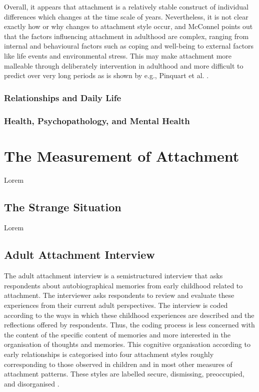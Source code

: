 \documentclass[12pt]{report}
\begin{document}
Overall, it appears that attachment is a relatively stable construct of individual differences which changes at the time scale of years. Nevertheless, it is not clear exactly how or why changes to attachment style occur, and McConnel \cite{McConnell2011} points out that the factors influencing attachment in adulthood are complex, ranging from internal and behavioural factors such as coping and well-being to external factors like life events and environmental stress. This may make attachment more malleable through deliberately intervention in adulthood and more difficult to predict over very long periods as is shown by e.g., Pinquart et al. \cite{Pinquart2013}.

\subsubsection{Relationships and Daily Life}

\subsubsection{Health, Psychopathology, and Mental Health}

\section{The Measurement of Attachment}
Lorem

\subsection{The Strange Situation}
Lorem

\subsection{Adult Attachment Interview}
The adult attachment interview is a semistructured interview that asks respondents about autobiographical memories from early childhood related to attachment. The interviewer asks respondents to review and evaluate these experiences from their current adult perspectives. The interview is coded according to the ways in which these childhood experiences are described and the reflections offered by respondents. Thus, the coding process is less concerned with the content of the specific content of memories and more interested in the organisation of thoughts and memories. This cognitive organisation according to early relationships is categorised into four attachment styles roughly corresponding to those observed in children and in most other measures of attachment patterns. These styles are labelled secure, dismissing, preoccupied, and disorganised \cite{Hesse1999, AAITest}.
\end{document}
